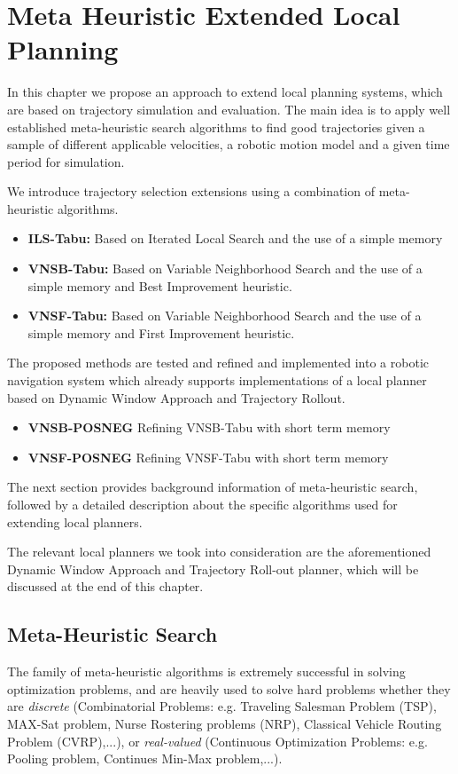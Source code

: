 \chapter{Meta Heuristic Extended Local Planning}\label{ch:meta}

In this chapter we propose an approach to extend local planning systems, which are based on trajectory simulation and evaluation. The main idea is to apply well established meta-heuristic search algorithms to find good trajectories given a sample of different applicable velocities, a robotic motion model and a given time period for simulation. 

We introduce trajectory selection extensions using a combination of meta-heuristic algorithms.

\begin{itemize}
\item{\bf{ILS-Tabu:}}  Based on Iterated Local Search and the use of a simple memory
\item{\bf{VNSB-Tabu:}} Based on Variable Neighborhood Search and the use of a simple memory and Best Improvement heuristic.
\item{\bf{VNSF-Tabu:}} Based on Variable Neighborhood Search and the use of a simple memory and First Improvement heuristic.
\end{itemize}

The proposed methods are tested and refined and implemented into a robotic navigation system which already supports implementations of a local planner based on Dynamic Window Approach and Trajectory Rollout.

\begin{itemize}
\item{\bf{VNSB-POSNEG}} Refining VNSB-Tabu with short term memory
\item{\bf{VNSF-POSNEG}} Refining VNSF-Tabu with short term memory
\end{itemize}

The next section provides background information of meta-heuristic search, followed by a detailed description about the specific algorithms used for extending local planners.

The relevant local planners we took into consideration are the aforementioned Dynamic Window Approach and Trajectory Roll-out planner, which will be discussed at the end of this chapter.

\section{Meta-Heuristic Search}
The family of meta-heuristic algorithms is extremely successful in solving optimization problems, and are heavily used to solve hard problems whether they are  \emph{discrete} (Combinatorial Problems: e.g. Traveling Salesman Problem (TSP), MAX-Sat problem, Nurse Rostering problems (NRP), Classical Vehicle Routing Problem (CVRP),...), or \emph{real-valued} (Continuous Optimization Problems: e.g. Pooling problem, Continues Min-Max problem,...).

